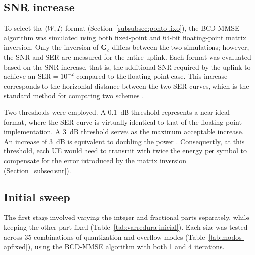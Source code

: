
\subsection{\texorpdfstring{SNR increase}{SNR increase}}

To select the $\langle W, I\rangle$ format (Section~\ref{subsubsec:ponto-fixo}), the BCD-MMSE algorithm was simulated using both fixed-point and 64-bit floating-point matrix inversion. Only the inversion of $\mathbf G_c$ differs between the two simulations; however, the SNR and SER are measured for the entire uplink. Each format was evaluated based on the SNR increase, that is, the additional SNR required by the uplink to achieve an $\mathrm{SER} = 10^{-2}$ compared to the floating-point case. This increase corresponds to the horizontal distance between the two SER curves, which is the standard method for comparing two schemes \cite[p.~55]{tse-viswanath}.

Two thresholds were employed. A 0.1~dB threshold represents a near-ideal format, where the SER curve is virtually identical to that of the floating-point implementation. A 3~dB threshold serves as the maximum acceptable increase. An increase of 3~dB is equivalent to doubling the power \cite[p.~73]{tse-viswanath}. Consequently, at this threshold, each UE would need to transmit with twice the energy per symbol to compensate for the error introduced by the matrix inversion (Section~\ref{subsec:snr}).



\subsection{\texorpdfstring{Initial sweep}{Initial sweep}}
The first stage involved varying the integer and fractional parts separately, while keeping the other part fixed (Table~\ref{tab:varredura-inicial}). Each size was tested across 35 combinations of quantization and overflow modes (Table~\ref{tab:modos-apfixed}), using the BCD-MMSE algorithm with both 1 and 4 iterations.

